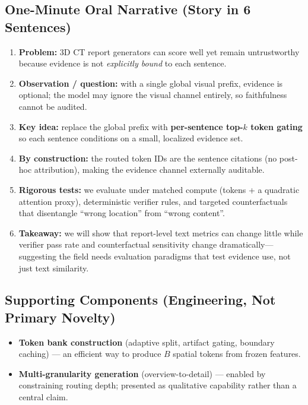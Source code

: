 \documentclass[11pt,a4paper]{article}
\begin{document}
\subsection{One-Minute Oral Narrative (Story in 6 Sentences)}
\begin{tcolorbox}[colback=blue!2, colframe=stagecolor, arc=1mm, boxrule=0.5pt, left=6pt, right=6pt, top=4pt, bottom=4pt]
\small
\begin{enumerate}[nosep]
    \item \textbf{Problem:} 3D CT report generators can score well yet remain untrustworthy because evidence is not \emph{explicitly bound} to each sentence.
    \item \textbf{Observation / question:} with a single global visual prefix, evidence is optional; the model may ignore the visual channel entirely, so faithfulness cannot be audited.
    \item \textbf{Key idea:} replace the global prefix with \textbf{per-sentence top-$k$ token gating} so each sentence conditions on a small, localized evidence set.
    \item \textbf{By construction:} the routed token IDs are the sentence citations (no post-hoc attribution), making the evidence channel externally auditable.
    \item \textbf{Rigorous tests:} we evaluate under matched compute (tokens + a quadratic attention proxy), deterministic verifier rules, and targeted counterfactuals that disentangle ``wrong location'' from ``wrong content''.
    \item \textbf{Takeaway:} we will show that report-level text metrics can change little while verifier pass rate and counterfactual sensitivity change dramatically---suggesting the field needs evaluation paradigms that test evidence use, not just text similarity.
\end{enumerate}
\end{tcolorbox}


\subsection{Supporting Components (Engineering, Not Primary Novelty)}
\begin{itemize}[nosep]
    \item \textbf{Token bank construction} (adaptive split, artifact gating, boundary caching) --- an efficient way to produce $B$ spatial tokens from frozen features.
    \item \textbf{Multi-granularity generation} (overview-to-detail) --- enabled by constraining routing depth; presented as qualitative capability rather than a central claim.
\end{itemize}
\end{document}
